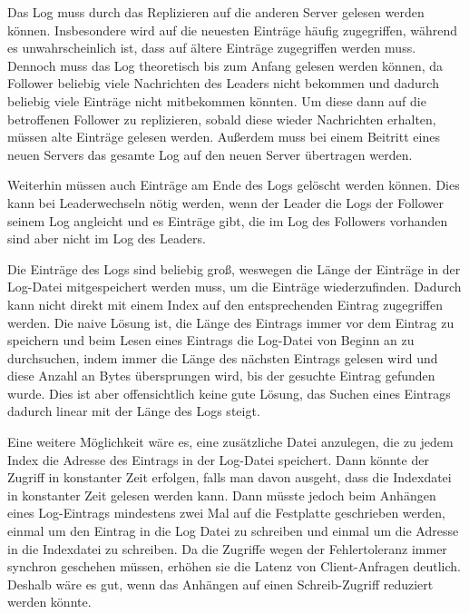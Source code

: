 Das Log muss durch das Replizieren auf die anderen Server gelesen werden können. Insbesondere wird auf die neuesten Einträge häufig zugegriffen, während es unwahrscheinlich ist, dass auf ältere Einträge zugegriffen werden muss. Dennoch muss das Log theoretisch bis zum Anfang gelesen werden können, da Follower beliebig viele Nachrichten des Leaders nicht bekommen und dadurch beliebig viele Einträge nicht mitbekommen könnten. Um diese dann auf die betroffenen Follower zu replizieren, sobald diese wieder Nachrichten erhalten, müssen alte Einträge gelesen werden. Außerdem muss bei einem Beitritt eines neuen Servers das gesamte Log auf den neuen Server übertragen werden.

Weiterhin müssen auch Einträge am Ende des Logs gelöscht werden können. Dies kann bei Leaderwechseln nötig werden, wenn der Leader die Logs der Follower seinem Log angleicht und es Einträge gibt, die im Log des Followers vorhanden sind aber nicht im Log des Leaders.

Die Einträge des Logs sind beliebig groß, weswegen die Länge der Einträge in der Log-Datei mitgespeichert werden muss, um die Einträge wiederzufinden. Dadurch kann nicht direkt mit einem Index auf den entsprechenden Eintrag zugegriffen werden. Die naive Lösung ist, die Länge des Eintrags immer vor dem Eintrag zu speichern und beim Lesen eines Eintrags die Log-Datei von Beginn an zu durchsuchen, indem immer die Länge des nächsten Eintrags gelesen wird und diese Anzahl an Bytes übersprungen wird, bis der gesuchte Eintrag gefunden wurde. Dies ist aber offensichtlich keine gute Lösung, das Suchen eines Eintrags dadurch linear mit der Länge des Logs steigt.

Eine weitere Möglichkeit wäre es, eine zusätzliche Datei anzulegen, die zu jedem Index die Adresse des Eintrags in der Log-Datei speichert. Dann könnte der Zugriff in konstanter Zeit erfolgen, falls man davon ausgeht, dass die Indexdatei in konstanter Zeit gelesen werden kann. Dann müsste jedoch beim Anhängen eines Log-Eintrags mindestens zwei Mal auf die Festplatte geschrieben werden, einmal um den Eintrag in die Log Datei zu schreiben und einmal um die Adresse in die Indexdatei zu schreiben. Da die Zugriffe wegen der Fehlertoleranz immer synchron geschehen müssen, erhöhen sie die Latenz von Client-Anfragen deutlich. Deshalb wäre es gut, wenn das Anhängen auf einen Schreib-Zugriff reduziert werden könnte.

